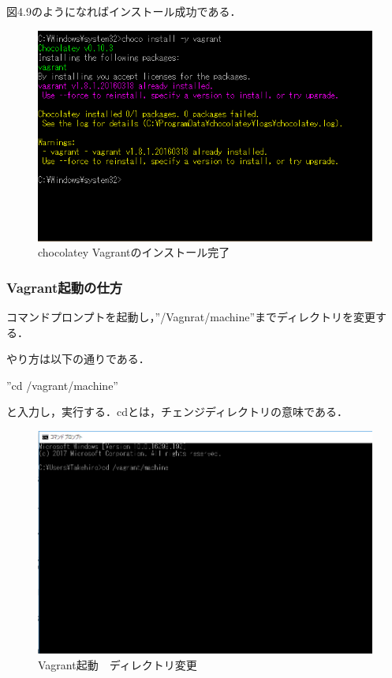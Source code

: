 図4.9のようになればインストール成功である．
\begin{figure}[htb]
\centering
\includegraphics[width=13cm]{4-9.png}
\caption{chocolatey Vagrantのインストール完了}\label{4-9}
\end{figure}
\newpage

\subsubsection{Vagrant起動の仕方}
コマンドプロンプトを起動し，”/Vagnrat/machine”までディレクトリを変更する．

やり方は以下の通りである．

”cd /vagrant/machine”

と入力し，実行する．cdとは，チェンジディレクトリの意味である．
\begin{figure}[htb]
\centering
\includegraphics[width=13cm]{4-10.png}
\caption{Vagrant起動　ディレクトリ変更}\label{4-10}
\end{figure}
\newpage

